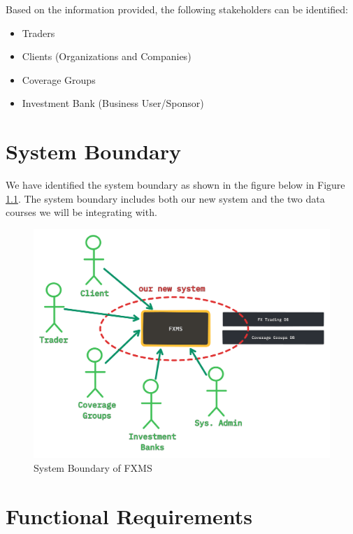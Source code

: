 \documentclass[a4paper]{report}
\begin{document}
Based on the information provided, the following stakeholders can be identified:
\begin{itemize}
    \item Traders
    \item Clients (Organizations and Companies)
    \item Coverage Groups
    \item Investment Bank (Business User/Sponsor)
\end{itemize}

\chapter{System Boundary}

We have identified the system boundary as shown in the figure below in Figure \ref{fig:system-boundary}. The system boundary includes both our new system and the two data courses we will be integrating with.

\begin{figure}[h!]
    \centering
    \includegraphics[width=\textwidth]{images/system-boundary.png}
    \caption{System Boundary of FXMS}
    \label{fig:system-boundary}
\end{figure}

\chapter{Functional Requirements}
\end{document}

